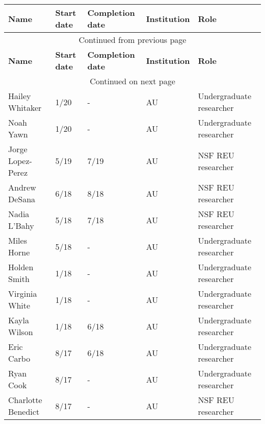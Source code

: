 {\sffamily\small
{}
\begin{longtable}[l]{ p{1.2in} p{0.5in} p{0.8in}p{0.75in} p{2in} }
    \hline
    \textbf{Name} & \textbf{Start date} & \textbf{Completion date} & \textbf{Institution} & \textbf{Role} \\
    \hline
    \endfirsthead
    \multicolumn{5}{c}{{Continued from previous page}} \\
    \hline
    \textbf{Name} & \textbf{Start date} & \textbf{Completion date} & \textbf{Institution} & \textbf{Role} \\
    \hline
    \endhead
    \hline \multicolumn{5}{c}{{Continued on next page}} \\
    \endfoot
    \hline
    \endlastfoot
    Hailey Whitaker & 1/20 & - & AU & Undergraduate researcher \\
    Noah Yawn & 1/20 & - & AU & Undergraduate researcher \\
    Jorge Lopez-Perez & 5/19 & 7/19 & AU & NSF REU researcher \\
    Andrew DeSana & 6/18 & 8/18 & AU & NSF REU researcher \\
    Nadia L'Bahy & 5/18 & 7/18 & AU & NSF REU researcher \\
    Miles Horne & 5/18 & - & AU & Undergraduate researcher \\
    Holden Smith & 1/18 & - & AU & Undergraduate researcher \\
    Virginia White & 1/18 & - & AU & Undergraduate researcher \\
    Kayla Wilson & 1/18 & 6/18 & AU & Undergraduate researcher \\
    Eric Carbo & 8/17 & 6/18 & AU & Undergraduate researcher \\
    Ryan Cook & 8/17 & - & AU & Undergraduate researcher \\
    Charlotte Benedict & 8/17 & - & AU & NSF REU researcher \\
\end{longtable}
}
